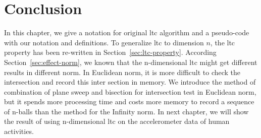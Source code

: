 \section{Conclusion}
In this chapter, we give a notation for original \acrshort{ltc} algorithm and a
pseudo-code with our notation and definitions. To generalize \acrshort{ltc} to
dimension $n$, the \acrshort{ltc} property has been re-written in
Section~\ref{sec:ltc-property}. According Section~\ref{sec:effect-norm}, we
known that the n-dimensional \acrshort{ltc} might get different results in
different norm. In Euclidean norm, it is more difficult to check the
intersection and record this inter section in memory. We introduce the method of
combination of plane sweep and bisection for intersection test in Euclidean
norm, but it spends more processing time and costs more memory to record a
sequence of n-balls than the method for the Infinity norm. In next chapter, we
will show the result of using n-dimensional \acrshort{ltc} on the accelerometer
data of human activities. 
